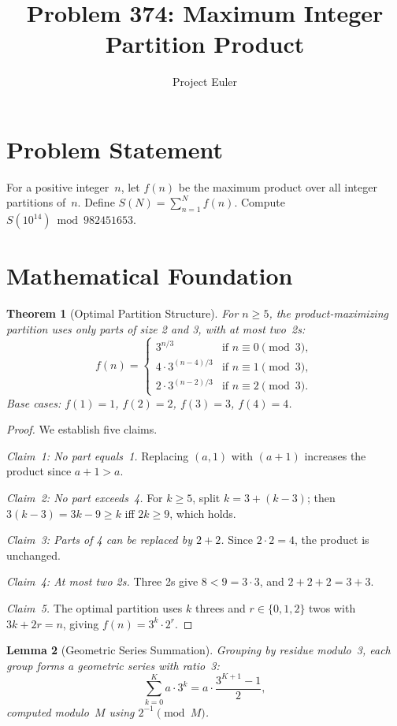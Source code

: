 \documentclass[12pt]{article}
\title{Problem 374: Maximum Integer Partition Product}
\author{Project Euler}
\date{}
\newtheorem{theorem}{Theorem}
\newtheorem{lemma}[theorem]{Lemma}
\begin{document}
\maketitle

\section{Problem Statement}

For a positive integer~$n$, let $f(n)$ be the maximum product over all integer partitions of~$n$. Define $S(N) = \sum_{n=1}^{N} f(n)$. Compute $S(10^{14}) \bmod 982451653$.

\section{Mathematical Foundation}

\begin{theorem}[Optimal Partition Structure]
For $n \ge 5$, the product-maximizing partition uses only parts of size 2 and 3, with at most two~2s:
\[
f(n) = \begin{cases}
3^{n/3} & \text{if } n \equiv 0 \pmod{3}, \\[4pt]
4 \cdot 3^{(n-4)/3} & \text{if } n \equiv 1 \pmod{3}, \\[4pt]
2 \cdot 3^{(n-2)/3} & \text{if } n \equiv 2 \pmod{3}.
\end{cases}
\]
Base cases: $f(1)=1$, $f(2)=2$, $f(3)=3$, $f(4)=4$.
\end{theorem}

\begin{proof}
We establish five claims.

\emph{Claim~1: No part equals~1.} Replacing $(a,1)$ with $(a{+}1)$ increases the product since $a+1 > a$.

\emph{Claim~2: No part exceeds~4.} For $k \ge 5$, split $k = 3 + (k{-}3)$; then $3(k{-}3) = 3k-9 \ge k$ iff $2k \ge 9$, which holds.

\emph{Claim~3: Parts of 4 can be replaced by $2+2$.} Since $2 \cdot 2 = 4$, the product is unchanged.

\emph{Claim~4: At most two 2s.} Three 2s give $8 < 9 = 3 \cdot 3$, and $2+2+2 = 3+3$.

\emph{Claim~5.} The optimal partition uses $k$ threes and $r \in \{0,1,2\}$ twos with $3k + 2r = n$, giving $f(n) = 3^k \cdot 2^r$.
\end{proof}

\begin{lemma}[Geometric Series Summation]
Grouping by residue modulo~3, each group forms a geometric series with ratio~3:
\[
\sum_{k=0}^{K} a \cdot 3^k = a \cdot \frac{3^{K+1}-1}{2},
\]
computed modulo~$M$ using $2^{-1} \pmod{M}$.
\end{lemma}
\end{document}
